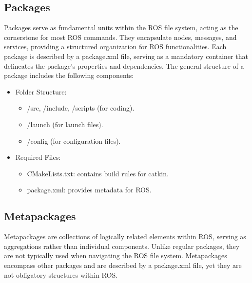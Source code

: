 \subsection{Packages}
Packages serve as fundamental units within the ROS file system, acting as the cornerstone for most ROS commands. 
They encapsulate nodes, messages, and services, providing a structured organization for ROS functionalities.
Each package is described by a package.xml file, serving as a mandatory container that delineates the package's properties and dependencies.
The general structure of a package includes the following components:
\begin{itemize}
    \item Folder Structure:
        \begin{itemize}
            \item /src, /include, /scripts (for coding).
            \item /launch (for launch files).
            \item /config (for configuration files).
        \end{itemize}
    \item Required Files:
        \begin{itemize}
            \item CMakeLists.txt: contains build rules for catkin.
            \item package.xml: provides metadata for ROS.\@
        \end{itemize}
\end{itemize}

\subsection{Metapackages}
Metapackages are collections of logically related elements within ROS, serving as aggregations rather than individual components. 
Unlike regular packages, they are not typically used when navigating the ROS file system. 
Metapackages encompass other packages and are described by a package.xml file, yet they are not obligatory structures within ROS.\@